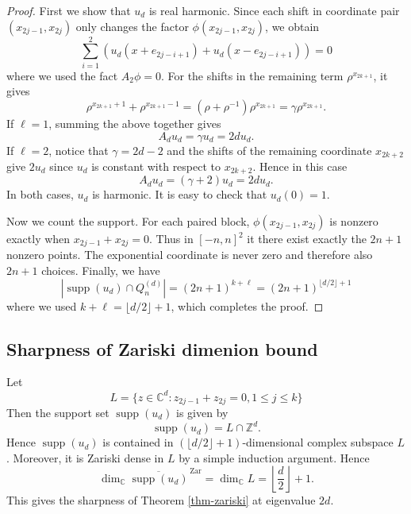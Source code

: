\documentclass[11pt,reqno]{amsart}
\newcommand\Z{\ensuremath{\mathbb{Z}}}
\newcommand\C{\ensuremath{\mathbb{C}}}
\newcommand{\supp}{\operatorname{supp}}
\theoremstyle{definition}
\theoremstyle{plain}
\numberwithin{equation}{section}
\begin{document}
\begin{proof}
First we show that $u_d$ is real harmonic. Since each shift in coordinate pair $(x_{2j-1},x_{2j})$ only changes the factor $\phi(x_{2j-1},x_{2j})$, we obtain
\begin{equation*}
    \sum_{i=1}^2 \left(u_d(x+e_{2j-i+1})+u_d(x-e_{2j-i+1})\right)=0
\end{equation*}
where we used the fact $A_2 \phi =0$. For the shifts in the remaining term $\rho^{x_{2k+1}}$, it gives
\begin{equation*}
    \rho^{x_{2k+1}+1}+\rho^{x_{2k+1}-1}=(\rho+\rho^{-1})\rho^{x_{2k+1}}=\gamma \rho^{x_{2k+1}}.
\end{equation*}
If $\ell =1$, summing the above together gives
\begin{equation*}
    A_du_d=\gamma u_d =2d u_d.
\end{equation*}
If $\ell=2$, notice that $\gamma=2d-2$ and the shifts of the remaining coordinate $x_{2k+2}$ give $2u_d$ since $u_d$ is constant with respect to $x_{2k+2}$. Hence in this case
\begin{equation*}
    A_d u_d=(\gamma+2)u_d=2du_d.
\end{equation*}
In both cases, $u_d$ is harmonic. It is easy to check that $u_d(0)=1$.

Now we count the support. For each paired block, $\phi(x_{2j-1},x_{2j})$ is nonzero exactly when $x_{2j-1}+x_{2j}=0$. Thus in $[-n,n]^2$ it there exist exactly the $2n+1$ nonzero points. The exponential coordinate is never zero and therefore also $2n+1$ choices. Finally, we have
\begin{equation*}
    |\supp(u_d)\cap Q_n^{(d)}|=(2n+1)^{k+\ell}=(2n+1)^{\lfloor d/2\rfloor+1}
\end{equation*}
where we used $k+\ell =\lfloor d/2\rfloor +1$, which completes the proof.
\end{proof}


\subsection{Sharpness of Zariski dimenion bound}\label{subsec:sharp-zariski}
    Let
    \begin{equation*}
        L=\lbrace z\in \C^d:z_{2j-1}+z_{2j}=0,1\le j\le k\rbrace
    \end{equation*}
    Then the support set $\supp (u_d)$ is given by
    \begin{equation*}
        \supp(u_d)=L\cap \Z^d.
    \end{equation*}
    Hence $\supp(u_d)$ is contained in $(\lfloor d/2\rfloor+1)$-dimensional complex subspace $L$. Moreover, it is Zariski dense in $L$ by a simple induction argument. Hence
    \begin{equation*}
        \dim_\C \overline{\supp (u_d)}^{\,\mathrm{Zar}}=\dim_\C L = \left\lfloor \frac{d}{2}\right\rfloor +1.
    \end{equation*}
    This gives the sharpness of Theorem \ref{thm-zariski} at eigenvalue $2d$.
\end{document}
